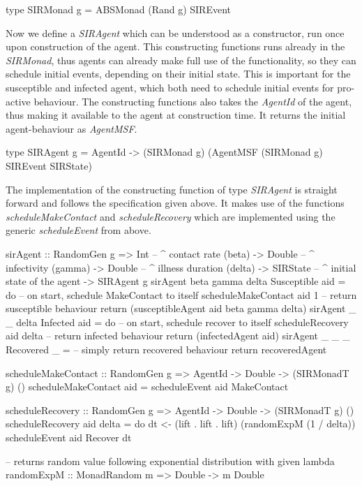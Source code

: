 \begin{HaskellCode}
type SIRMonad g = ABSMonad (Rand g) SIREvent
\end{HaskellCode}

Now we define a \textit{SIRAgent} which can be understood as a constructor, run once upon construction of the agent. This constructing functions runs already in the \textit{SIRMonad}, thus agents can already make full use of the functionality, so they can schedule initial events, depending on their initial state. This is important for the susceptible and infected agent, which both need to schedule initial events for pro-active behaviour. The constructing functions also takes the \textit{AgentId} of the agent, thus making it available to the agent at construction time. It returns the initial agent-behaviour as \textit{AgentMSF}.

\begin{HaskellCode}
type SIRAgent g = AgentId -> (SIRMonad g) (AgentMSF (SIRMonad g) SIREvent SIRState)
\end{HaskellCode}

The implementation of the constructing function of type \textit{SIRAgent} is straight forward and follows the specification given above. It makes use of the functions \textit{scheduleMakeContact} and \textit{scheduleRecovery} which are implemented using the generic \textit{scheduleEvent} from above.

\begin{HaskellCode}
sirAgent :: RandomGen g 
         => Int         -- ^ contact rate (beta)
         -> Double      -- ^ infectivity (gamma)
         -> Double      -- ^ illness duration (delta)
         -> SIRState    -- ^ initial state of the agent
         -> SIRAgent g
sirAgent beta gamma delta Susceptible aid = do
  -- on start, schedule MakeContact to itself
  scheduleMakeContact aid 1
  -- return susceptible behaviour
  return (susceptibleAgent aid beta gamma delta)
sirAgent _ _ delta Infected aid = do
  -- on start, schedule recover to itself
  scheduleRecovery aid delta
  -- return infected behaviour
  return (infectedAgent aid)
sirAgent _ _ _ Recovered _ = 
  -- simply return recovered behaviour
  return recoveredAgent

scheduleMakeContact :: RandomGen g => AgentId -> Double -> (SIRMonadT g) ()
scheduleMakeContact aid = scheduleEvent aid MakeContact

scheduleRecovery :: RandomGen g => AgentId -> Double -> (SIRMonadT g) ()
scheduleRecovery aid delta = do
  dt <- (lift . lift . lift) (randomExpM (1 / delta))
  scheduleEvent aid Recover dt

-- returns random value following exponential distribution with given lambda
randomExpM :: MonadRandom m => Double -> m Double
\end{HaskellCode}

